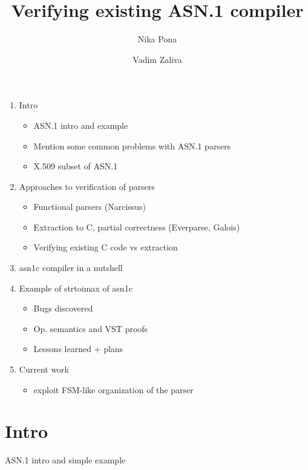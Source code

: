 \documentclass[acmsmall,nonacm]{acmart}
\begin{document}
\title{Verifying existing ASN.1 compiler}

\author{Nika Pona}
\author{Vadim Zaliva}

\maketitle

\begin{abstract}

\end{abstract}
\begin{enumerate}

\item Intro
  \begin{itemize}
  \item ASN.1 intro and example 
  \item Mention some common problems with ASN.1 parsers
    \item X.509 subset of ASN.1
  \end{itemize}
\item Approaches to verification of parsers
  \begin{itemize}
  \item Functional parsers (Narcissus)
  \item Extraction to C, partial correctness (Everparse, Galois)
   \item Verifying existing C code vs extraction
  \end{itemize}
  \item asn1c compiler in a nutshell
  \item Example of strtoimax of asn1c
\begin{itemize}
\item Bugs discovered
  \item Op. semantics and VST proofs
  \item Lessons learned + plans
  \end{itemize}
\item Current work
  \begin{itemize}
  \item exploit FSM-like organization of the parser
    \end{itemize}

\end{enumerate}

\section{Intro}
 ASN.1 intro and simple example 
\end{document}
